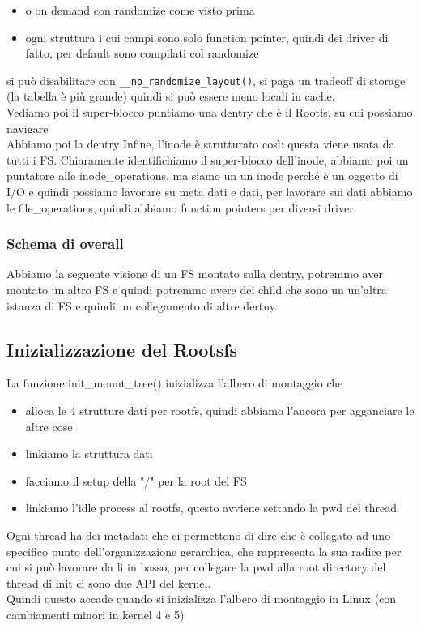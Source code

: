 \documentclass[12pt, oneside]{extbook}
\begin{document}
\begin{itemize}
\item o on demand con randomize come visto prima
\item ogni struttura i cui campi sono solo function pointer, quindi dei driver di fatto, per default sono compilati col randomize
\end{itemize}
si può disabilitare con \texttt{\_\_no\_randomize\_layout()}, si paga un tradeoff di storage (la tabella è più grande) quindi si può essere meno locali in cache.\\Vediamo poi il super-blocco
puntiamo una dentry che è il Rootfs, su cui possiamo navigare\\Abbiamo poi la dentry
Infine, l'inode è strutturato così:
questa viene usata da tutti i FS. Chiaramente identifichiamo il super-blocco dell'inode, abbiamo poi un puntatore alle inode\_operations, ma siamo un un inode perché è un oggetto di I/O e quindi possiamo lavorare su meta dati e dati, per lavorare sui dati abbiamo le file\_operations, quindi abbiamo function pointers per diversi driver.
\subsubsection{Schema di overall}
Abbiamo la seguente visione di un FS montato
sulla dentry, potremmo aver montato un altro FS e quindi potremmo avere dei child che sono un un'altra istanza di FS e quindi un collegamento di altre dertny.
\subsection{Inizializzazione del Rootsfs}
La funzione init\_mount\_tree() inizializza l'albero di montaggio che 
\begin{itemize}
\item alloca le 4 strutture dati per rootfs, quindi abbiamo l'ancora per agganciare le altre cose
\item linkiamo la struttura dati
\item facciamo il setup della "/" per la root del FS
\item linkiamo l'idle process al rootfs, questo avviene settando la pwd del thread
\end{itemize}
Ogni thread ha dei metadati che ci permettono di dire che è collegato ad uno specifico punto dell'organizzazione gerarchica, che rappresenta la sua radice per cui si può lavorare da lì in basso, per collegare la pwd alla root directory del thread di init ci sono due API del kernel.\\Quindi questo accade quando si inizializza l'albero di montaggio in Linux (con cambiamenti minori in kernel 4 e 5)
\end{document}
